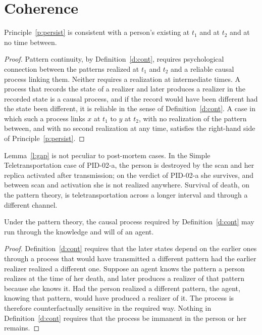 \documentclass{situationist-preprint}
\begin{document}
\section{Coherence}\label{s:coh}

\begin{lemma}[Gaps]\label{l:gap}
Principle~\ref{p:persist} is consistent with a person's existing at $t_1$ and at $t_2$ and at no time between.
\end{lemma}

\begin{proof}
Pattern continuity, by Definition~\ref{d:cont}, requires psychological connection between the patterns realized at $t_1$ and $t_2$ and a reliable causal process linking them. Neither requires a realization at intermediate times. A process that records the state of a realizer and later produces a realizer in the recorded state is a causal process, and if the record would have been different had the state been different, it is reliable in the sense of Definition~\ref{d:cont}. A case in which such a process links $x$ at $t_1$ to $y$ at $t_2$, with no realization of the pattern between, and with no second realization at any time, satisfies the right-hand side of Principle~\ref{p:persist}.
\end{proof}

Lemma~\ref{l:gap} is not peculiar to post-mortem cases. In the Simple Teletransportation case of PID-02-a, the person is destroyed by the scan and her replica activated after transmission; on the verdict of PID-02-a she survives, and between scan and activation she is not realized anywhere. Survival of death, on the pattern theory, is teletransportation across a longer interval and through a different channel.

\begin{lemma}[Bridge]\label{l:bridge}
Under the pattern theory, the causal process required by Definition~\ref{d:cont} may run through the knowledge and will of an agent.
\end{lemma}

\begin{proof}
Definition~\ref{d:cont} requires that the later states depend on the earlier ones through a process that would have transmitted a different pattern had the earlier realizer realized a different one. Suppose an agent knows the pattern a person realizes at the time of her death, and later produces a realizer of that pattern because she knows it. Had the person realized a different pattern, the agent, knowing that pattern, would have produced a realizer of it. The process is therefore counterfactually sensitive in the required way. Nothing in Definition~\ref{d:cont} requires that the process be immanent in the person or her remains.
\end{proof}
\end{document}
